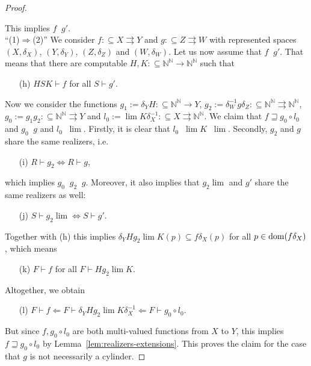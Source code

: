 \documentclass[a4paper]{amsart}
\def\IN{{\mathbb{N}}}
\def\TO{\Longrightarrow}
\def\In{\subseteq}
\def\mto{\rightrightarrows}
\def\dom{{\rm dom}}
\def\Baire{{\IN^\IN}}
\def\leqSW{\mathop{\leq_{\mathrm{sW}}}}
\def\equivSW{\mathop{\equiv_{\mathrm{sW}}}}
\theoremstyle{definition}
\begin{document}
\begin{proof}
\begin{enumerate}
\end{enumerate}
This implies $f\leqSW g'$.\\
``(1)$\TO$(2)'' 
We consider $f:\In X\mto Y$ and $g:\In Z\mto W$ with represented spaces $(X,\delta_X)$,
$(Y,\delta_Y)$, $(Z,\delta_Z)$ and $(W,\delta_W)$.
Let us now assume that $f\leqSW g'$.
That means that there are computable $H,K:\In\Baire\to\Baire$ such that 
\begin{enumerate}
\item[(h)] $HSK\vdash f$ for all $S\vdash g'$.
\end{enumerate}
Now we consider the functions $g_1:=\delta_YH:\In\Baire\to Y$, $g_2:=\delta_W^{-1}g\delta_Z:\In\Baire\mto\Baire$,
$g_0:=g_1g_2:\In\Baire\mto Y$ and $l_0:=\lim K\delta_X^{-1}:\In X\mto\Baire$. 
We claim that $f\sqsupseteq g_0\circ l_0$ and $g_0\leqSW g$ and $l_0\leqSW\lim$. 
Firstly, it is clear that $l_0\leqSW\lim K\leqSW\lim$.
Secondly, $g_2$ and $g$ share the same realizers, i.e.\
\begin{enumerate}
\item[(i)] $R\vdash g_2\iff R\vdash g$,
\end{enumerate}
which implies $g_0\leqSW g_2\equivSW g$. Moreover, it also implies
that $g_2\lim$ and $g'$ share the same realizers as well:
\begin{enumerate}
\item[(j)] $S\vdash g_2\lim\iff S\vdash g'$.
\end{enumerate}
Together with (h) this implies $\delta_YHg_2\lim K(p)\In f\delta_X(p)$ for all $p\in\dom(f\delta_X)$, which means
\begin{enumerate}
\item[(k)]  $F\vdash f$ for all $F\vdash Hg_2\lim K$.
\end{enumerate}
Altogether, we obtain
\begin{enumerate}
\item[(l)] $F\vdash f\Longleftarrow F\vdash\delta_YHg_2\lim K\delta_X^{-1}\Longleftarrow F\vdash g_0\circ l_0$.
\end{enumerate}
But since $f,g_0\circ l_0$ are both multi-valued functions from $X$ to $Y$, this implies
$f\sqsupseteq g_0\circ l_0$ by Lemma~\ref{lem:realizers-extensions}. This proves the claim for the case that $g$ is not necessarily
a cylinder. 


\end{proof}
\end{document}
